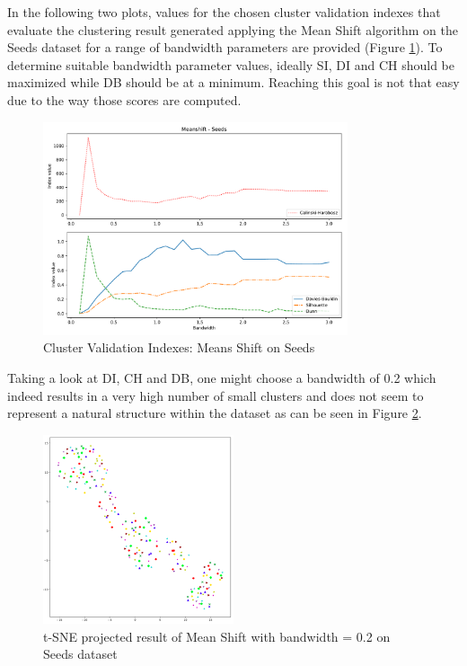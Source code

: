 In the following two plots, values for the chosen cluster validation indexes that evaluate the clustering result generated applying the Mean Shift algorithm on the Seeds dataset for a range of bandwidth parameters are provided (Figure \ref{fig:mean_shift_seeds_indexes}).
To determine suitable bandwidth parameter values, ideally SI, DI and CH should be maximized while DB should be at a minimum. 
Reaching this goal is not that easy due to the way those scores are computed.
\newline
\begin{figure}[H]
\begin{center}
\includegraphics[width=0.8\textwidth]{images/Meanshift_-_Seeds.pdf}
\caption{Cluster Validation Indexes: Means Shift on Seeds}
\end{center}
\label{fig:mean_shift_seeds_indexes}
\end{figure}
Taking a look at DI, CH and DB, one might choose a bandwidth of 0.2 which indeed results in a very high number of small clusters and does not seem to represent a natural structure within the dataset as can be seen in Figure \ref{fig:meanshift_seeds_clustering_tsne}.
\begin{figure}[H]
    \centering
    \includegraphics[width=0.5\textwidth]{images/Meanshift_Seeds_0_2.png}
    \caption{t-SNE projected result of Mean Shift with bandwidth = 0.2 on Seeds dataset}
    \label{fig:meanshift_seeds_clustering_tsne}
\end{figure}

